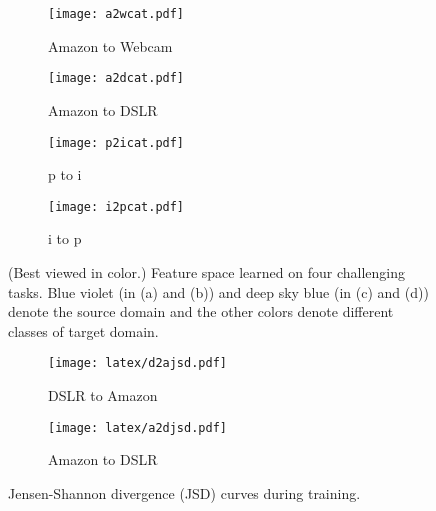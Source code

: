 \documentclass[10pt,twocolumn,letterpaper]{article}
\begin{document}
\begin{figure}[t]
\vspace{-0.cm}
\centering
\begin{subfigure}{0.2\textwidth}
  \centering
  \texttt{[image: a2wcat.pdf]}
  \caption{Amazon to Webcam}
  \label{afig:5-1}
\end{subfigure}
\begin{subfigure}{0.2\textwidth}
  \centering
  \texttt{[image: a2dcat.pdf]}
  \caption{Amazon to DSLR}
  \label{afig:5-2}
\end{subfigure}
\begin{subfigure}{0.2\textwidth}
  \centering
  \texttt{[image: p2icat.pdf]}
  \caption{p to i}
  \label{afig:5-3}
\end{subfigure}
\begin{subfigure}{0.2\textwidth}
  \centering
  \texttt{[image: i2pcat.pdf]}
  \caption{i to p}
  \label{afig:5-4}
\end{subfigure}
\vspace{-0.2cm}
\caption{(Best viewed in color.) Feature space learned on four challenging tasks. Blue violet (in (a) and (b)) and deep sky blue (in (c) and (d)) denote the source domain and the other colors denote different classes of target domain.}\vspace{-0.3cm}
\label{afig:5}
\end{figure}

\begin{figure}[t]
\vspace{-0.3cm}
\centering
\begin{subfigure}{0.22\textwidth}
  \centering
  \texttt{[image: latex/d2ajsd.pdf]}\vspace{-0.1cm}
  \caption{DSLR to Amazon}
  \label{afig:4-1}
\end{subfigure}
\begin{subfigure}{0.22\textwidth}
  \centering
  \texttt{[image: latex/a2djsd.pdf]}\vspace{-0.1cm}
  \caption{Amazon to DSLR}
  \label{afig:4-2}
\end{subfigure}

\caption{Jensen-Shannon divergence (JSD) curves during training.}
\label{afig:4}
\end{figure}
\end{document}
